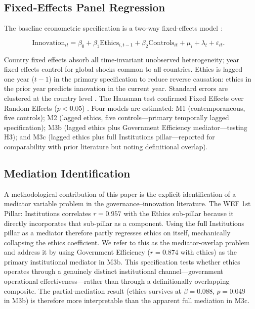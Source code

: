 \documentclass[pdflatex,sn-apa]{sn-jnl}
\begin{document}
\subsection{Fixed-Effects Panel Regression}

The baseline econometric specification is a two-way fixed-effects model \citep{baltagi2005,wooldridge2010,hsiao2014}:

\begin{equation}
\mathrm{Innovation}_{it} = \beta_0 + \beta_1 \mathrm{Ethics}_{i,t-1} + \beta_2 \mathrm{Controls}_{it} + \mu_i + \lambda_t + \varepsilon_{it}.
\label{eq:fe}
\end{equation}

Country fixed effects absorb all time-invariant unobserved heterogeneity; year fixed effects control for global shocks common to all countries. Ethics is lagged one year ($t-1$) in the primary specification to reduce reverse causation: ethics in the prior year predicts innovation in the current year. Standard errors are clustered at the country level \citep{wooldridge2010}. The Hausman test confirmed Fixed Effects over Random Effects ($p<0.05$) \citep{hsiao2014}. Four models are estimated: M1 (contemporaneous, five controls); M2 (lagged ethics, five controls---primary temporally lagged specification); M3b (lagged ethics plus Government Efficiency mediator---testing H3); and M3c (lagged ethics plus full Institutions pillar---reported for comparability with prior literature but noting definitional overlap).

\subsection{Mediation Identification}
\label{sec:mediation}

A methodological contribution of this paper is the explicit identification of a mediator variable problem in the governance--innovation literature. The WEF 1st Pillar: Institutions correlates $r=0.957$ with the Ethics sub-pillar because it directly incorporates that sub-pillar as a component. Using the full Institutions pillar as a mediator therefore partly regresses ethics on itself, mechanically collapsing the ethics coefficient. We refer to this as the mediator-overlap problem and address it by using Government Efficiency ($r=0.874$ with ethics) as the primary institutional mediator in M3b. This specification tests whether ethics operates through a genuinely distinct institutional channel---government operational effectiveness---rather than through a definitionally overlapping composite. The partial-mediation result (ethics survives at $\beta=0.088$, $p=0.049$ in M3b) is therefore more interpretable than the apparent full mediation in M3c.
\end{document}
